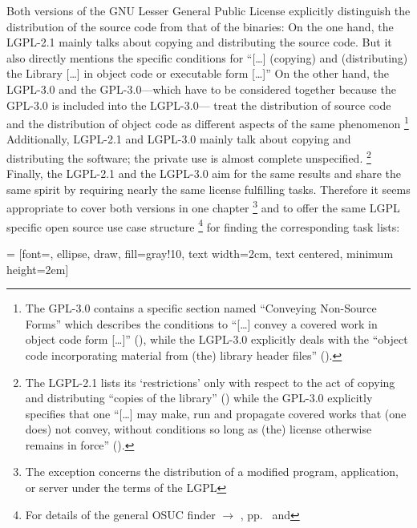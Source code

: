 Both versions of the GNU Lesser General Public License explicitly distinguish
the distribution of the source code from that of the binaries: On the one hand,
the LGPL-2.1 mainly talks about copying and distributing the source
code. But it also directly mentions the specific
conditions for \enquote{[\ldots] (copying) and (distributing) the Library
[\ldots] in object code or executable form [\ldots]} On the other
hand, the LGPL-3.0 and the GPL-3.0---which have to be considered together
because the GPL-3.0 is included into the LGPL-3.0--- treat the distribution of source code and the distribution of object
code as different aspects of the same phenomenon%
  \footnote{The GPL-3.0 contains a specific section named 
    \enquote{Conveying Non-Source Forms} which describes the conditions to
    \enquote{[\ldots] convey a covered work in object code form [\ldots]}
    (\cite[cf.][\nopage wp.\ §6]{Gpl30OsiLicense2007a}), while the LGPL-3.0
    explicitly deals with the 
    \enquote{object code incorporating material from (the) library header files}
    (\cite[cf.][\nopage wp.\ §3]{Lgpl30OsiLicense2007a}).}
Additionally, LGPL-2.1 and LGPL-3.0 mainly talk about copying and distributing
the software; the private use is almost complete unspecified.%
  \footnote{The LGPL-2.1 lists its `restrictions' only with respect to the act
    of copying and distributing \enquote{copies of the library} 
    (\cite[cf.][\nopage wp.\ §1, §2, §4 et passim]{Lgpl21OsiLicense1999a}) 
    while the GPL-3.0 explicitly specifies that one \enquote{[\ldots] may make,
    run and propagate covered works that (one does) not convey, without
    conditions so long as (the) license otherwise remains in force} 
    (\cite[cf.][\nopage wp.\ §2]{Gpl30OsiLicense2007a}).}
Finally, the LGPL-2.1 and the LGPL-3.0 aim for the same results and share the
same spirit by requiring nearly the same license fulfilling tasks. Therefore it
seems appropriate to cover both versions in one chapter%
  \footnote{The exception concerns the distribution of a modified program,
    application, or server under the terms of the LGPL} 
and to offer the same LGPL specific open source use case structure%
  \footnote{For details of the general OSUC finder $\rightarrow$ \oslic,
    pp.\ \pageref{OsucTokens} and \pageref{OsucDefinitionTree}} 
for finding the corresponding task lists: 
 
 = [font=\scriptsize, ellipse, draw, fill=gray!10, 
    text width=2cm, text centered, minimum height=2em]



